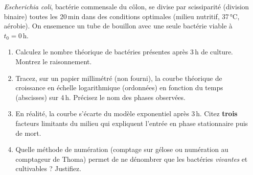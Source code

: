 \documentclass[11pt]{article}
\begin{document}
\begin{exercice}
\emph{Escherichia coli}, bactérie commensale du côlon, se divise par scissiparité (division binaire) toutes les 20\,min dans des conditions optimales (milieu nutritif, 37\,°C, aérobie). On ensemence un tube de bouillon avec une seule bactérie viable à $t_0 = 0\,\text{h}$.

\begin{enumerate}
    \item Calculez le nombre théorique de bactéries présentes après 3\,h de culture. Montrez le raisonnement.
    \item Tracez, sur un papier millimétré (non fourni), la courbe théorique de croissance en échelle logarithmique (ordonnées) en fonction du temps (abscisses) sur 4\,h. Précisez le nom des phases observées.
    \item En réalité, la courbe s'écarte du modèle exponentiel après 3\,h. Citez \textbf{trois} facteurs limitants du milieu qui expliquent l'entrée en phase stationnaire puis de mort.
    \item Quelle méthode de numération (comptage sur gélose ou numération au comptageur de Thoma) permet de ne dénombrer que les bactéries \emph{vivantes} et cultivables ? Justifiez.
\end{enumerate}
\end{exercice}
\end{document}
